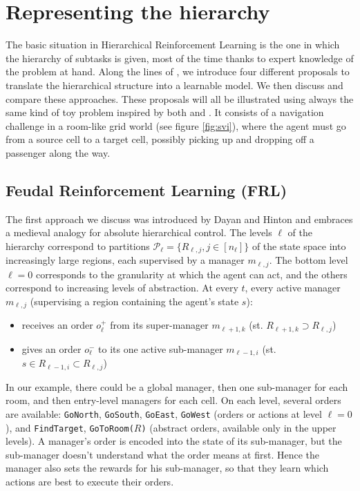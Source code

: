\documentclass{article}
\begin{document}
\section{Representing the hierarchy} \label{representing}

The basic situation in Hierarchical Reinforcement Learning is the one in which the hierarchy of subtasks is given, most of the time thanks to expert knowledge of the problem at hand. Along the lines of \cite{barto_recent_2003}, we introduce four different proposals to translate the hierarchical structure into a learnable model. We then discuss and compare these approaches. These proposals will all be illustrated using always the same kind of toy problem inspired by both \cite{dietterich_hierarchical_2000} and \cite{sutton_between_1999}. It consists of a navigation challenge in a room-like grid world (see figure \ref{fig:svi}), where the agent must go from a source cell to a target cell, possibly picking up and dropping off a passenger along the way.

\subsection{Feudal Reinforcement Learning (FRL)}

The first approach we discuss was introduced by Dayan and Hinton \cite{dayan_feudal_1993} and embraces a medieval analogy for absolute hierarchical control. The levels $\ell$ of the hierarchy correspond to partitions $\mathcal{P}_{\ell} = \{R_{\ell, j}, j \in [n_{\ell}]\}$ of the state space into increasingly large regions, each supervised by a manager $m_{\ell, j}$. The bottom level $\ell = 0$ corresponds to the granularity at which the agent can act, and the others correspond to increasing levels of abstraction. At every $t$, every active manager $m_{\ell, j}$ (supervising a region containing the agent's state $s$):
\begin{itemize}
    \item receives an order $o_{\ell}^+$ from its super-manager $m_{\ell+1, k}$ (st. $R_{\ell+1, k}  \supset R_{\ell, j}$)
    \item gives an order $o_{\ell}^-$ to its one active sub-manager $m_{\ell-1, i}$ (st. $s \in R_{\ell-1, i} \subset R_{\ell, j}$)
\end{itemize}

In our example, there could be a global manager, then one sub-manager for each room, and then entry-level managers for each cell. On each level, several orders are available: \texttt{GoNorth}, \texttt{GoSouth}, \texttt{GoEast}, \texttt{GoWest} (orders or actions at level $\ell=0$), and \texttt{FindTarget}, \texttt{GoToRoom($R$)} (abstract orders, available only in the upper levels). A manager's order is encoded into the state of its sub-manager, but the sub-manager doesn't understand what the order means at first. Hence the manager also sets the rewards for his sub-manager, so that they learn which actions are best to execute their orders.
\end{document}
